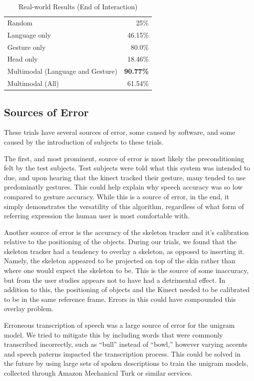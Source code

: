 \documentclass[a4paper, 11pt]{article} %
\begin{document}
\begin{table}
\caption{Real-world Results (End of Interaction)\label{table:end_real}}
\centering
\begin{tabular}{lr}
\toprule
Random & 25\%\\
Language only &  46.15\%\\
Gesture only  &  80.0\%\\
Head only     & 18.46\%\\
Multimodal (Language and Gesture) & {\bf 90.77\%}\\
Multimodal (All) &  61.54\%\\
\bottomrule
\end{tabular}
\end{table}
\subsection{Sources of Error}
These trials have several sources of error, some caused by software, and some caused by the introduction of subjects to these trials.

The first, and most prominent, source of error is most likely the preconditioning felt by the test subjects. Test subjects were told what this system was intended to due, and upon hearing that the kinect tracked their gesture, many tended to use predominatly gestures. This could help explain why speech accuracy was so low compared to gesture accuracy. While this is a source of error, in the end, it simply demonstrates the versatility of this algorithm, regardless of what form of referring expression the human user is most comfortable with.

Another source of error is the accuracy of the skeleton tracker and it's calibration relative to the positioning of the objects. During our trials, we found that the skeleton tracker had a tendency to overlay a skeleton, as opposed to inserting it. Namely, the skeleton appeared to be projected on top of the skin rather than where one would expect the skeleton to be. This is the source of some inaccuracy, but from the user studies appears not to have had a detrimental effect. In addition to this, the positioning of objects and the Kinect needed to be calibrated to be in the same reference frame. Errors in this could have compounded this overlay problem.

Erroneous transcription of speech was a large source of error for the unigram model. We tried to mitigate this by including words that were commonly transcribed incorrectly, such as ``bull'' instead of ``bowl,'' however varying accents and speech paterns impacted the transcription process. This could be solved in the future by using large sets of spoken descriptions to train the unigram models, collected through Amazon Mechanical Turk or similar services.
\end{document}
